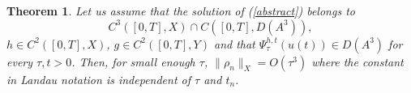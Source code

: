 \documentclass[a4paper,12pt]{article}
\newtheorem{theorem}{Theorem}
\begin{document}
\begin{theorem} Let us assume that the solution of (\ref{abstract}) belongs to
$$C^3([0,T],X) \cap C([0,T], D(A^3)),$$
$h\in  C^2([0,T],X)$, $g\in  C^2([0,T],Y)$ and that $\Psi_{\tau}^{h,t}(u(t))\in D(A^3)$ for every $\tau, t>0$. Then, for small enough $\tau$,
$\|\rho_n\|_X=O(\tau^3)$ where the constant in Landau notation is independent of $\tau$ and $t_n$.

\label{thloc_ab}
\end{theorem}
\end{document}
